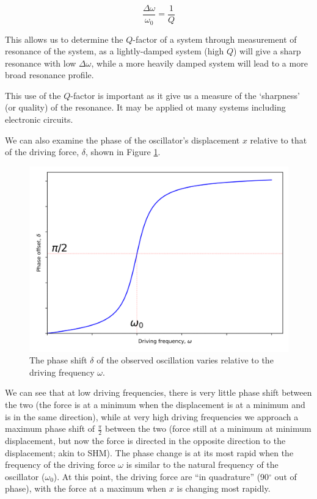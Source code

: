 \documentclass[
]{book}
\begin{document}
\begin{equation}
\frac{\Delta \omega}{\omega_0} = \frac{1}{Q}
\label{eq:ch5-resonancequality1}
\end{equation}

This allows us to determine the \(Q\)-factor of a system through measurement of resonance of the system, as a lightly-damped system (high \(Q\)) will give a sharp resonance with low \(\Delta \omega\), while a more heavily damped system will lead to a more broad resonance profile.

This use of the \(Q\)-factor is important as it give us a measure of the `sharpness' (or quality) of the resonance. It may be applied ot many systems including electronic circuits.

We can also examine the phase of the oscillator's displacement \(x\) relative to that of the driving force, \(\delta\), shown in Figure \ref{fig:ch5-resonancephaseshift1}.

\begin{figure}

{\centering \includegraphics[width=0.7\linewidth]{visualisations/ch5-forcedosc3} 

}

\caption{The phase shift $\delta$ of the observed oscillation varies relative to the driving frequency $\omega$.}\label{fig:ch5-resonancephaseshift1}
\end{figure}

We can see that at low driving frequencies, there is very little phase shift between the two (the force is at a minimum when the displacement is at a minimum and is in the same direction), while at very high driving frequencies we approach a maximum phase shift of \(\frac{\pi}{2}\) between the two (force still at a minimum at minimum displacement, but now the force is directed in the opposite direction to the displacement; akin to SHM). The phase change is at its most rapid when the frequency of the driving force \(\omega\) is similar to the natural frequency of the oscillator (\(\omega_0\)). At this point, the driving force are ``in quadrature'' (90\(^\circ\) out of phase), with the force at a maximum when \(x\) is changing most rapidly.
\end{document}
